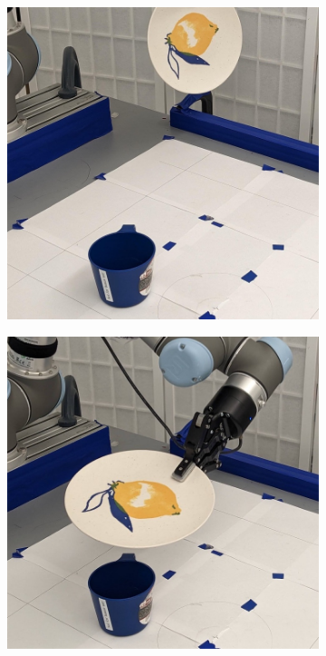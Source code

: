 \documentclass{article}
\begin{document}
\begin{figure}[]
\begin{subfigure}{(\linewidth - 0.05\linewidth)/5}
    \end{subfigure}
    \begin{subfigure}{(\linewidth - 0.05\linewidth)/5}
        \centering
        \includegraphics[width=\linewidth]{figures/episodes/bowl_on_mug/7.jpg}
    \end{subfigure}
    \begin{subfigure}{(\linewidth - 0.05\linewidth)/5}
        \centering
        \includegraphics[width=\linewidth]{figures/episodes/bowl_on_mug/8.jpg}

\end{subfigure}
\end{figure}
\end{document}
